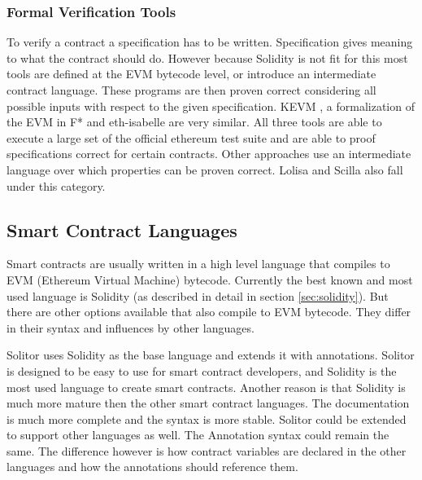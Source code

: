 \documentclass[a4paper]{article}
\begin{document}
\subsubsection{Formal Verification Tools}
To verify a contract a specification has to be written. Specification gives meaning to what the contract should do. However because Solidity is not fit for this most tools are defined at the EVM bytecode level, or introduce an intermediate contract language. These programs are then proven correct considering all possible inputs with respect to the given specification. KEVM \cite{hildenbrandt2017kevm}, a formalization of the EVM in F* \cite{grishchenko2018semantic} and eth-isabelle \cite{hirai2017defining} are very similar. All three tools are able to execute a large set of the official ethereum test suite and are able to proof specifications correct for certain contracts. Other approaches use an intermediate language over which properties can be proven correct. Lolisa \cite{yang2018lolisa} and Scilla \cite{sergey2018scilla} also fall under this category. 

\subsection{Smart Contract Languages}
Smart contracts are usually written in a high level language that compiles to EVM (Ethereum Virtual Machine) bytecode. Currently the best known and most used language is Solidity (as described in detail in section \ref{sec:solidity}). But there are other options available that also compile to EVM bytecode. They differ in their syntax and influences by other languages. \par
Solitor uses Solidity as the base language and extends it with annotations. Solitor is designed to be easy to use for smart contract developers, and Solidity is the most used language to create smart contracts. Another reason is that Solidity is much more mature then the other smart contract languages. The documentation is much more complete and the syntax is more stable. Solitor could be extended to support other languages as well. The Annotation syntax could remain the same. The difference however is how contract variables are declared in the other languages and how the annotations should reference them.
\end{document}

